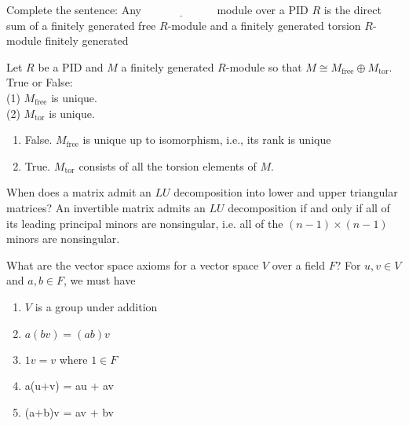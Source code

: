 \documentclass[avery5371,grid]{flashcards}
\newcommand{\blank}{$\; \underline{\hspace{1in}} \; $}
\begin{document}
\begin{flashcard}[Modules]{Complete the sentence: Any \blank module over a PID $R$ is the direct sum of a finitely generated free $R$-module and a finitely generated torsion $R$-module}
 finitely generated\\
\end{flashcard}

\begin{flashcard}[Modules]{Let $R$ be a PID and $M$ a finitely generated $R$-module so that $M \cong M_\text{free} \oplus M_\text{tor}$. \\True or False: \\(1) $M_\text{free}$ is unique. \\(2) $M_\text{tor}$ is unique.}
\begin{enumerate}
     \item False. $M_\text{free}$ is unique up to isomorphism, i.e., its rank is unique
     \item True. $M_\text{tor}$ consists of all the torsion elements of $M$.
\end{enumerate}
\end{flashcard}





\begin{flashcard}{When does a matrix admit an $LU$ decomposition into lower and upper triangular matrices?}
 An invertible matrix admits an $LU$ decomposition if and only if all of its leading principal minors are nonsingular, i.e. all of the $(n-1) \times (n-1)$ minors are nonsingular.
\end{flashcard}

\begin{flashcard}{What are the vector space axioms for a vector space $V$ over a field $F$?}
 For $u,v \in V$ and $a,b \in F$, we must have
  \begin{enumerate}
   \item $V$ is a group under addition
   \item $a(bv) = (ab)v$
   \item $1v = v$ where $1 \in F$
   \item a(u+v) = au + av
   \item (a+b)v = av + bv
  \end{enumerate}
\end{flashcard}
\end{document}
